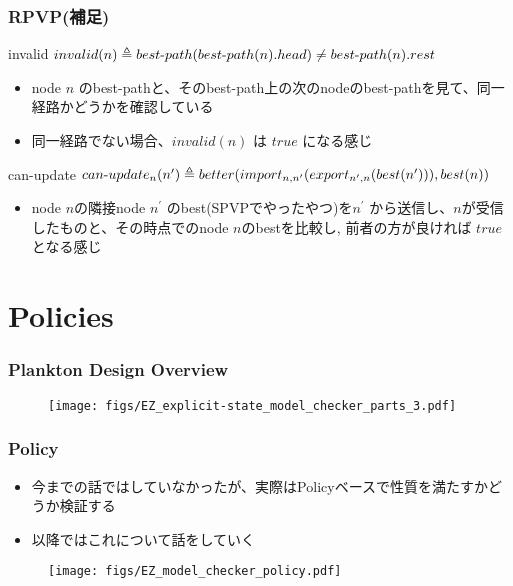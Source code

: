 \documentclass[dvipdfmx,9pt,notheorems]{beamer}
\theoremstyle{definition}
\begin{document}
\begin{frame}\frametitle{RPVP(補足)}
\begin{block}{invalid}
		\centering
		$invalid(n) \triangleq best\mathchar`-path(best\mathchar`-path(n).head) \neq best\mathchar`-path(n).rest$
\end{block}
\begin{itemize}
	\item node $n$ のbest-pathと、そのbest-path上の次のnodeのbest-pathを見て、同一経路かどうかを確認している
	\item 同一経路でない場合、$invalid(n)$ は $true$ になる感じ
\end{itemize}
\begin{block}{can-update}
		\centering
		$can\mathchar`-update_n(n^{\prime}) \triangleq better(import_{n,n^{\prime}}(export_{n^{\prime},n}(best(n^{\prime}))), best(n))$
\end{block}
\begin{itemize}
	\item node $n$の隣接node $n^{\prime}$ のbest(SPVPでやったやつ)を$n^{\prime}$ から送信し、$n$が受信したものと、その時点でのnode $n$のbestを比較し, 前者の方が良ければ $true$ となる感じ
\end{itemize}
\end{frame}

\section{Policies}

\begin{frame}\frametitle{Plankton Design Overview}
  \begin{figure}[htb]
    \centering
    \texttt{[image: figs/EZ\_explicit-state\_model\_checker\_parts\_3.pdf]}
  \end{figure}%
\end{frame}

\begin{frame}\frametitle{Policy}
\begin{itemize}
	\item 今までの話ではしていなかったが、実際はPolicyベースで性質を満たすかどうか検証する
	\item 以降ではこれについて話をしていく
\end{itemize}
\begin{figure}[htb]
  \centering
	\texttt{[image: figs/EZ\_model\_checker\_policy.pdf]}
\end{figure}%
\pnote{
}
\end{frame}
\end{document}
